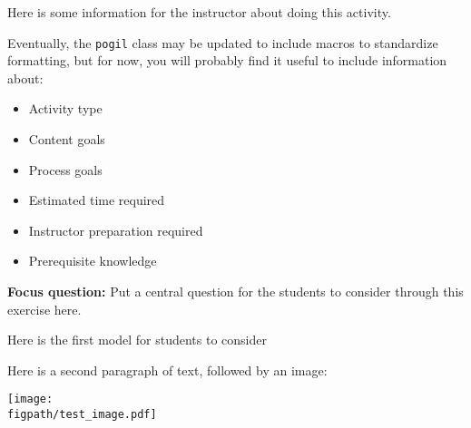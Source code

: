 %
%
%
%

\renewcommand{\figpath}{content}
\renewcommand{\labelbase}{labelbase}

\begin{activity}
\label{\labelbase}

\begin{instructornotes}
	Here is some information for the instructor about doing this activity.
	
	Eventually, the \verb!pogil! class may be updated to include macros to standardize formatting, but for now, you will probably find it useful to include information about:
	
	\begin{itemize}
		\item Activity type
		\item Content goals
		\item Process goals
		\item Estimated time required
		\item Instructor preparation required
		\item Prerequisite knowledge
	\end{itemize}
	
\end{instructornotes}

	\textbf{Focus question:} Put a central question for the students to consider through this exercise here.



\begin{model}[ABC]
\label{\labelbase:mdl:MODEL1}

	Here is the first model for students to consider

	Here is a second paragraph of text, followed by an image:

	\centerline{\texttt{[image: \\figpath/test\_image.pdf]}}

\end{model}



\end{activity}
